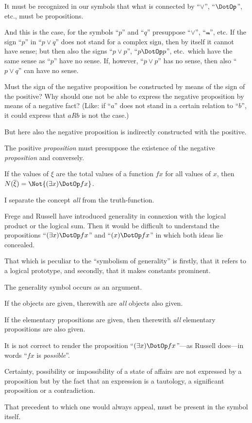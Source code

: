 {It must be recognized in our symbols that what
is connected by ``$\lor$'', ``$\DotOp$'', etc., must be propositions.

And this is the case, for the symbols ``$p$'' and
``$q$'' presuppose ``$\lor$'', ``$\Not{}$'', etc. If the sign
``$p$'' in ``$p \lor q$'' does not stand for a complex sign,
then by itself it cannot have sense; but then also
the signs ``$p \lor p$'', ``$p \DotOp p$'', etc.\ which have the
same sense as ``$p$'' have no sense. If, however,
``$p \lor p$'' has no sense, then also ``$p \lor q$'' can have
no sense.}


{Must the sign of the negative proposition be
constructed by means of the sign of the positive?
Why should one not be able to express the
negative proposition by means of a negative fact?
(Like: if ``$a$'' does not stand in a certain relation
to ``$b$'', it could express that $aRb$ is not the case.)

{\stretchyspace
But here also the negative proposition is indirectly
constructed with the positive.}

The positive \emph{proposition} must presuppose the
existence of the negative \emph{proposition} and conversely.}


{If the values of $\xi$ are the total values of a function
$fx$ for all values of $x$, then $N(\overline{\xi}) = \Not{(\exists x) \DotOp fx}$.}


{I separate the concept \emph{all} from the truth-function.

Frege and Russell have introduced generality
in connexion with the logical product or the logical
sum. Then it would be difficult to understand
the propositions ``$(\exists x) \DotOp fx$'' and ``$(x) \DotOp fx$'' in which
both ideas lie concealed.}


{That which is peculiar to the ``symbolism of
generality'' is firstly, that it refers to a logical
prototype, and secondly, that it makes constants
prominent.}


{The generality symbol occurs as an argument.}


{If the objects are given, therewith are \emph{all} objects
also given.

If the elementary propositions are given, then
therewith \emph{all} elementary propositions are also
given.}


{It is not correct to render the proposition
\enlargethispage{9pt} %
``$(\exists x) \DotOp fx$''---as Russell does---in words ``$fx$ is
\emph{possible}''.

Certainty, possibility or impossibility of a state
of affairs are not expressed by a proposition but
by the fact that an expression is a tautology, a
significant proposition or a contradiction.

That precedent to which one would always
appeal, must be present in the symbol itself.}


